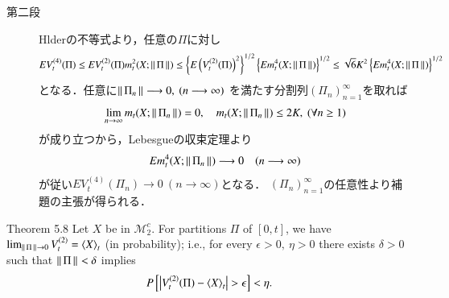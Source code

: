 \begin{prf}
\begin{description}
			\item[第二段]
				Hlderの不等式より，任意の$\Pi$に対し
				\begin{align}
					E V_t^{(4)}(\Pi) \leq E V_t^{(2)}(\Pi) m_t^2(X;\left\|\, \Pi\, \right\|_{})
					\leq \left\{ E \left(V_t^{(2)}(\Pi)\right)^2 \right\}^{1/2}
						\left\{ E m_t^4(X;\left\|\, \Pi\, \right\|_{}) \right\}^{1/2}
					\leq \sqrt{6} K^2 \left\{ E m_t^4(X;\left\|\, \Pi\, \right\|_{}) \right\}^{1/2}
				\end{align}
				となる．任意に$\left\|\, \Pi_n\, \right\|_{} \longrightarrow 0,\ (n \longrightarrow \infty)$
				を満たす分割列$(\Pi_n)_{n=1}^\infty$を取れば
				\begin{align}
					\lim_{n \to \infty} m_t(X;\left\|\, \Pi_n\, \right\|_{}) = 0,
					\quad m_t(X;\left\|\, \Pi_n\, \right\|_{}) \leq 2K,\ (\forall n \geq 1)
				\end{align}
				が成り立つから，Lebesgueの収束定理より
				\begin{align}
					E m_t^4(X;\left\|\, \Pi_n\, \right\|_{}) \longrightarrow 0\quad (n \longrightarrow \infty)
				\end{align}
				が従い$E V_t^{(4)}(\Pi_n) \longrightarrow 0\ (n \longrightarrow \infty)$となる．
				$(\Pi_n)_{n=1}^\infty$の任意性より補題の主張が得られる．
				\QED
		\end{description}
	\end{prf}
	
	\begin{itembox}[l]{Theorem 5.8}
		Let $X$ be in $\mathscr{M}_2^c$. For partitions $\Pi$ of $[0,t]$, we have
		$\lim_{\Norm{\Pi}{} \to 0} V_t^{(2)} = \inprod<X>_t$ (in probability); i.e.,
		for every $\epsilon > 0,\ \eta > 0$ there exists $\delta > 0$ such that $\left\|\, \Pi\, \right\|_{} < \delta$ implies
		\begin{align}
			P\left[ \left| V_t^{(2)}(\Pi) - \inprod<X>_t \right| > \epsilon \right] < \eta.
		\end{align}
	\end{itembox}
	
